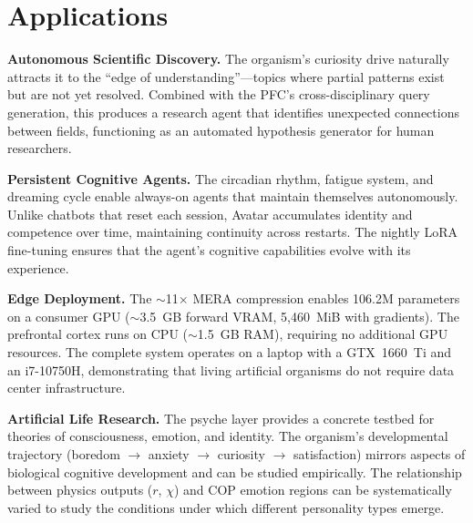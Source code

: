 \documentclass[11pt,a4paper,twocolumn]{article}
\begin{document}


\section{Applications}

\textbf{Autonomous Scientific Discovery.}
The organism's curiosity drive naturally attracts it to the ``edge of understanding''---topics where partial patterns exist but are not yet resolved.
Combined with the PFC's cross-disciplinary query generation, this produces a research agent that identifies unexpected connections between fields, functioning as an automated hypothesis generator for human researchers.

\textbf{Persistent Cognitive Agents.}
The circadian rhythm, fatigue system, and dreaming cycle enable always-on agents that maintain themselves autonomously.
Unlike chatbots that reset each session, Avatar accumulates identity and competence over time, maintaining continuity across restarts.
The nightly LoRA fine-tuning ensures that the agent's cognitive capabilities evolve with its experience.

\textbf{Edge Deployment.}
The $\sim$11$\times$ MERA compression enables 106.2M parameters on a consumer GPU ($\sim$3.5~GB forward VRAM, 5{,}460~MiB with gradients).
The prefrontal cortex runs on CPU ($\sim$1.5~GB RAM), requiring no additional GPU resources.
The complete system operates on a laptop with a GTX~1660~Ti and an i7-10750H, demonstrating that living artificial organisms do not require data center infrastructure.

\textbf{Artificial Life Research.}
The psyche layer provides a concrete testbed for theories of consciousness, emotion, and identity.
The organism's developmental trajectory (boredom $\to$ anxiety $\to$ curiosity $\to$ satisfaction) mirrors aspects of biological cognitive development and can be studied empirically.
The relationship between physics outputs ($r$, $\chi$) and COP emotion regions can be systematically varied to study the conditions under which different personality types emerge.

\end{document}
